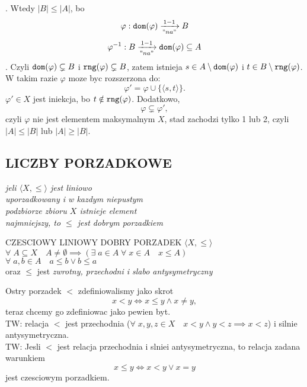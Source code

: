\documentclass{article}
\begin{document}
    . Wtedy $|B|\leq|A|$, bo
    $$\varphi:\texttt{dom}(\varphi)\xrightarrow["na"]{1-1} B$$
    $$\varphi^{-1}:B\xrightarrow["na"]{1-1}\texttt{dom}(\varphi)\subseteq A$$
    . Czyli $\texttt{dom}(\varphi)\subsetneq B$ i $\texttt{rng}(\varphi)\subsetneq B$, zatem istnieja $s\in A\setminus\texttt{dom}(\varphi)$ i $t\in B\setminus\texttt{rng}(\varphi)$. W takim razie $\varphi$ moze byc rozszerzona do:
    $$\varphi'=\varphi\cup\{\langle s,t\rangle\}.$$
    $\varphi'\in X$ jest iniekcja, bo $t\notin\texttt{rng}(\varphi)$. Dodatkowo,
    $$\varphi\subsetneq\varphi',$$
    czyli $\varphi$ nie jest elementem maksymalnym $X$, stad {\color{acc}zachodzi tylko 1 lub 2}, czyli $|A|\leq|B|$ lub $|A|\geq|B|$.\kondow
\subsection*{LICZBY PORZADKOWE}
    \begin{flushright}
        \emph{\color{dygresyja}jeli $\langle X,\leq\rangle$ jest liniowo \\uporzadkowany i w kazdym niepustym \\podzbiorze zbioru $X$ istnieje element \\{\color{acc}najmniejszy}, to $\leq$ jest {\color{tit} dobrym porzadkiem}}
    \end{flushright}\bigskip
    \begin{center}\large
        {\color{def}CZESCIOWY LINIOWY DOBRY PORZADEK} $\langle X,\leq\rangle$\smallskip\\
        $\forall\;A\subseteq X\quad A\neq \emptyset\implies (\exists\; a\in A\;\forall\;x\in A\quad x\leq A)$\smallskip\\
        $\forall \;a,b\in A\quad a\leq b\lor b\leq a$\medskip\\
        oraz $\leq$ jest \emph{zwrotny, przechodni i slabo antysymetryczny}
    \end{center}\bigskip
    Ostry porzadek $<$ zdefiniowalismy jako skrot
    $$x<y\iff x\leq y\land x\neq y,$$
    teraz chcemy go {\color{acc}zdefiniowac jako pewien byt}.\bigskip\\
    {\color{emp}TW}: relacja $<$ jest przechodnia ($\forall\;x,y,z\in X\quad x<y\land y<z\implies x<z$) i silnie antysymetryczna.\bigskip\\
    {\color{emp}TW}: Jesli $<$ jest relacja przechodnia i slniei antysymetryczna, to relacja zadana warunkiem 
    $$x\leq y\iff x<y\lor x=y$$ 
    jest czesciowym porzadkiem.\bigskip\\
\end{document}
